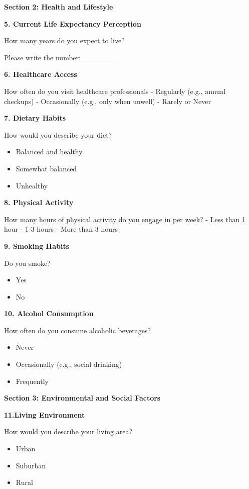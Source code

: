 \documentclass[
  letterpaper,
  DIV=11,
  numbers=noendperiod]{scrartcl}
\providecommand{\tightlist}{%
  \setlength{\itemsep}{0pt}\setlength{\parskip}{0pt}}\usepackage{longtable,booktabs,array}
\begin{document}
\textbf{Section 2: Health and Lifestyle}

\textbf{5. Current Life Expectancy Perception}

How many years do you expect to live?

Please write the number: \_\_\_\_\_\_

\textbf{6. Healthcare Access}

How often do you visit healthcare professionals - Regularly (e.g.,
annual checkups) - Occasionally (e.g., only when unwell) - Rarely or
Never

\textbf{7. Dietary Habits}

How would you describe your diet?

\begin{itemize}
\tightlist
\item
  Balanced and healthy
\item
  Somewhat balanced
\item
  Unhealthy
\end{itemize}

\textbf{8. Physical Activity}

How many hours of physical activity do you engage in per week? - Less
than 1 hour - 1-3 hours - More than 3 hours

\textbf{9. Smoking Habits}

Do you smoke?

\begin{itemize}
\tightlist
\item
  Yes
\item
  No
\end{itemize}

\textbf{10. Alcohol Consumption}

How often do you consume alcoholic beverages?

\begin{itemize}
\tightlist
\item
  Never
\item
  Occasionally (e.g., social drinking)
\item
  Frequently
\end{itemize}

\textbf{Section 3: Environmental and Social Factors}

\textbf{11.Living Environment}

How would you describe your living area?

\begin{itemize}
\tightlist
\item
  Urban
\item
  Suburban
\item
  Rural
\end{itemize}
\end{document}
